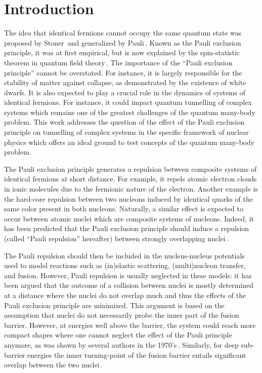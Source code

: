 \section{Introduction}

The idea that identical fermions cannot occupy the same quantum state was proposed by 
Stoner\,\citep{stoner1924} and  generalized by Pauli\,\citep{pauli1925}. Known as the Pauli exclusion 
principle, it was at first empirical, but is now  explained by the spin-statistic theorem in quantum 
field theory\,\citep{fierz1939,pauli1940}. The importance of the ``Pauli exclusion principle'' cannot 
be overstated. For instance, it is largely responsible for the stability of matter against collapse, 
as demonstrated by the existence of white dwarfs. It is also expected to play a crucial role 
in the dynamics of  systems of identical fermions. 
For instance, it could   impact quantum tunnelling of complex systems which remains 
one of the greatest challenges of the quantum many-body problem. 
This work addresses the question of the effect of the Pauli exclusion principle on tunnelling 
of complex systems in the specific framework of nuclear physics which offers an ideal ground 
to test concepts of the quantum many-body problem.

The Pauli exclusion principle generates a repulsion between composite systems 
of identical fermions at short distance.
For example, it repels atomic electron clouds in ionic molecules due to the fermionic nature of the electron.
Another example is the hard-core repulsion between two nucleons induced 
by identical quarks of the same color present in both nucleons.
Naturally, a similar effect is expected to occur between atomic nuclei which are composite systems of nucleons.
Indeed, it has been predicted that the Pauli exclusion principle should induce a repulsion 
(called ``Pauli repulsion'' hereafter) between strongly overlapping nuclei\,\citep{fliessbach1971}.

The Pauli repulsion should then be included in the nucleus-nucleus potentials used
to model reactions such as (in)elastic scattering, (multi)nucleon transfer, and fusion.
However, Pauli repulsion is usually neglected in these models:
it has been argued that the outcome of a collision between nuclei is mostly determined
at a  distance where the nuclei do not overlap much 
and thus the effects of the Pauli exclusion principle are minimized.
This argument is based on the assumption that nuclei do not necessarily probe
the inner part of the fusion barrier.
However, at energies well above the barrier, the system could reach more compact shapes
where one cannot neglect the effect of the Pauli principle anymore,
as was shown by several authors in the 1970's\,\citep{fliessbach1971,brink1975,zint1975,beck1978,sinha1979}.
Similarly, for deep sub-barrier energies the inner turning-point of the fusion barrier entails significant overlap
between the two nuclei\,\citep{dasso2003,umar2012a}.


